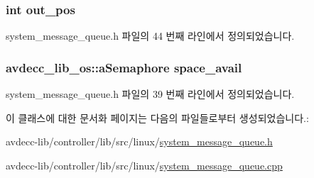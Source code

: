 \subsubsection[{\texorpdfstring{out\+\_\+pos}{out_pos}}]{\setlength{\rightskip}{0pt plus 5cm}int out\+\_\+pos\hspace{0.3cm}{\ttfamily [private]}}\hypertarget{classsystem__message__queue_aa2298e702cfd12ae1cbebcb523196e7c}{}\label{classsystem__message__queue_aa2298e702cfd12ae1cbebcb523196e7c}


system\+\_\+message\+\_\+queue.\+h 파일의 44 번째 라인에서 정의되었습니다.

\subsubsection[{\texorpdfstring{space\+\_\+avail}{space_avail}}]{\setlength{\rightskip}{0pt plus 5cm}avdecc\+\_\+lib\+\_\+os\+::a\+Semaphore space\+\_\+avail\hspace{0.3cm}{\ttfamily [private]}}\hypertarget{classsystem__message__queue_a19b006401cd5fa0b091e792d95e24587}{}\label{classsystem__message__queue_a19b006401cd5fa0b091e792d95e24587}


system\+\_\+message\+\_\+queue.\+h 파일의 39 번째 라인에서 정의되었습니다.



이 클래스에 대한 문서화 페이지는 다음의 파일들로부터 생성되었습니다.\+:\begin{DoxyCompactItemize}
\item 
avdecc-\/lib/controller/lib/src/linux/\hyperlink{linux_2system__message__queue_8h}{system\+\_\+message\+\_\+queue.\+h}\item 
avdecc-\/lib/controller/lib/src/linux/\hyperlink{linux_2system__message__queue_8cpp}{system\+\_\+message\+\_\+queue.\+cpp}\end{DoxyCompactItemize}
